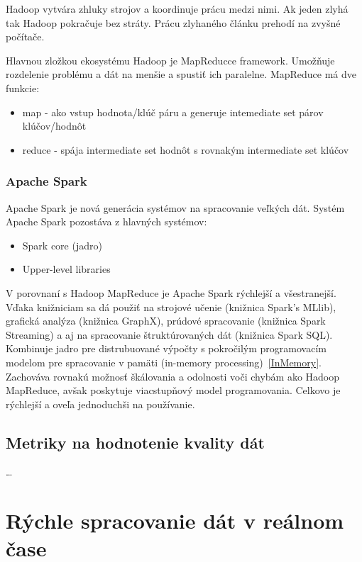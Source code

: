 \documentclass[10pt,twoside,slovak,a4paper]{article}
\begin{document}
Hadoop vytvára zhluky strojov a koordinuje prácu medzi nimi. Ak jeden zlyhá tak Hadoop pokračuje bez stráty. Prácu zlyhaného článku prehodí na zvyšné počítače.

Hlavnou zložkou ekosystému Hadoop je MapReducce framework. Umožňuje rozdelenie problému a dát na menšie a spustiť ich paralelne. MapReduce má dve funkcie:

\begin{itemize}
\item map - ako vstup hodnota/klúč páru a generuje intemediate set párov klúčov/hodnôt
\item reduce - spája intermediate set hodnôt s rovnakým intermediate set klúčov
\end{itemize}
\cite{ZakladneInfo}

\subsubsection {Apache Spark}

Apache Spark je nová generácia systémov na spracovanie veľkých dát. Systém Apache Spark pozostáva z hlavných systémov:
\begin{itemize}
\item Spark core (jadro)
\item Upper-level libraries
\end{itemize}
V porovnaní s Hadoop MapReduce je Apache Spark rýchlejší a všestranejší. Vďaka knižniciam sa dá použiť na strojové učenie (knižnica Spark’s MLlib), grafická analýza (knižnica GraphX), prúdové spracovanie (knižnica Spark Streaming) a aj na spracovanie štruktúrovaných dát (knižnica Spark SQL). Kombinuje jadro pre distrubuované výpočty s pokročilým programovacím modelom pre spracovanie v pamäti (in-memory processing)~\ref{InMemory}. Zachováva rovnakú možnosť škálovania a odolnosti voči chybám ako Hadoop MapReduce, avšak poskytuje viacstupňový model programovania. Celkovo je rýchlejší a oveľa jednoduchši na používanie.~\cite{Apache}

\subsection {Metriky na hodnotenie kvality dát} \label {Metriky}

\dots
~\cite{Metrics}


\section {Rýchle spracovanie dát v reálnom čase} \label{RychleSpracovanie}
\end{document}
